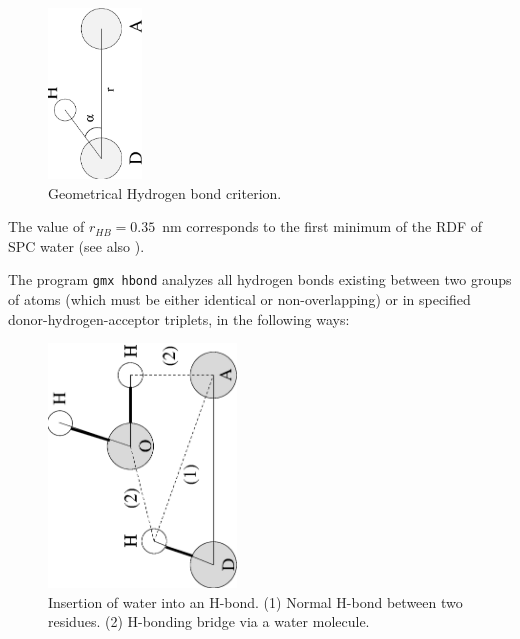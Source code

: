 \begin{figure}
\centerline{\includegraphics[width=2.5cm,angle=270]{plots/hbond}}
\caption{Geometrical Hydrogen bond criterion.}
\label{fig:hbond}
\end{figure}

The value of $r_{HB} = 0.35$~nm corresponds to the first minimum of the RDF of 
SPC water (see also ).

The program {\tt gmx hbond} analyzes all hydrogen bonds existing
between two groups of atoms (which must be either identical or
non-overlapping) or in specified donor-hydrogen-acceptor triplets, in
the following ways:

\begin{figure}
\centerline{
{\includegraphics[width=5cm,angle=270]{plots/hbond-insert}}}
\caption[Insertion of water into an H-bond.]{Insertion of water into
an H-bond. (1) Normal H-bond between two residues. (2) H-bonding
bridge via a water molecule.}
\label{fig:insert}
\end{figure}

